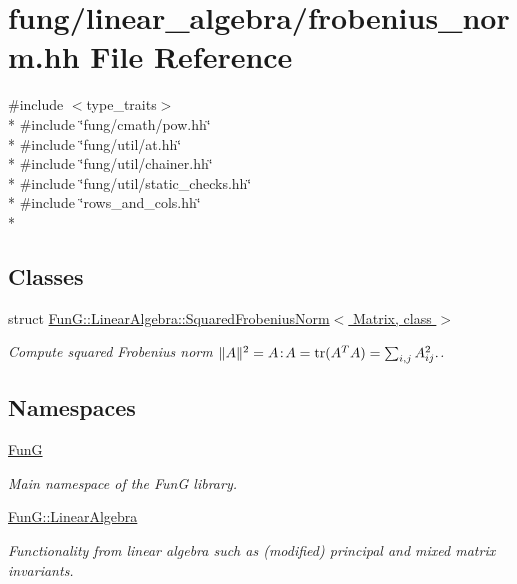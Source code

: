 \hypertarget{frobenius__norm_8hh}{}\section{fung/linear\+\_\+algebra/frobenius\+\_\+norm.hh File Reference}
\label{frobenius__norm_8hh}
{\ttfamily \#include $<$type\+\_\+traits$>$}\\*
{\ttfamily \#include \char`\"{}fung/cmath/pow.\+hh\char`\"{}}\\*
{\ttfamily \#include \char`\"{}fung/util/at.\+hh\char`\"{}}\\*
{\ttfamily \#include \char`\"{}fung/util/chainer.\+hh\char`\"{}}\\*
{\ttfamily \#include \char`\"{}fung/util/static\+\_\+checks.\+hh\char`\"{}}\\*
{\ttfamily \#include \char`\"{}rows\+\_\+and\+\_\+cols.\+hh\char`\"{}}\\*
\subsection*{Classes}
\begin{DoxyCompactItemize}
\item 
struct \hyperlink{structFunG_1_1LinearAlgebra_1_1SquaredFrobeniusNorm}{Fun\+G\+::\+Linear\+Algebra\+::\+Squared\+Frobenius\+Norm$<$ Matrix, class $>$}
\begin{DoxyCompactList}\small\item\em Compute squared Frobenius norm $ \|A\|^2 = A\negthinspace : \negthinspace A = \mathrm{tr}(A^TA) = \sum_{i,j} A_{ij}^2. $. \end{DoxyCompactList}\end{DoxyCompactItemize}
\subsection*{Namespaces}
\begin{DoxyCompactItemize}
\item 
 \hyperlink{namespaceFunG}{Fun\+G}
\begin{DoxyCompactList}\small\item\em Main namespace of the Fun\+G library. \end{DoxyCompactList}\item 
 \hyperlink{namespaceFunG_1_1LinearAlgebra}{Fun\+G\+::\+Linear\+Algebra}
\begin{DoxyCompactList}\small\item\em Functionality from linear algebra such as (modified) principal and mixed matrix invariants. \end{DoxyCompactList}\end{DoxyCompactItemize}

